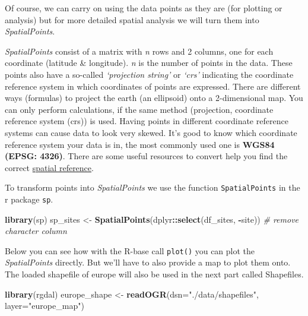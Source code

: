 \documentclass[
]{book}
\newenvironment{Shaded}{\begin{snugshade}}{\end{snugshade}}
\newcommand{\CommentTok}[1]{\textcolor[rgb]{0.56,0.35,0.01}{\textit{#1}}}
\newcommand{\DataTypeTok}[1]{\textcolor[rgb]{0.13,0.29,0.53}{#1}}
\newcommand{\KeywordTok}[1]{\textcolor[rgb]{0.13,0.29,0.53}{\textbf{#1}}}
\newcommand{\NormalTok}[1]{#1}
\newcommand{\OperatorTok}[1]{\textcolor[rgb]{0.81,0.36,0.00}{\textbf{#1}}}
\newcommand{\StringTok}[1]{\textcolor[rgb]{0.31,0.60,0.02}{#1}}
\begin{document}
Of course, we can carry on using the data points as they are (for plotting or analysis) but for more detailed spatial analysis we will turn them into \emph{SpatialPoints}.

\emph{SpatialPoints} consist of a matrix with \emph{n} rows and 2 columns, one for each coordinate (latitude \& longitude). \emph{n} is the number of points in the data. These points also have a so-called \emph{`projection string'} or \emph{`crs'} indicating the coordinate reference system in which coordinates of points are expressed.
There are different ways (formulas) to project the earth (an ellipsoid) onto a 2-dimensional map. You can only perform calculations, if the same method (projection, coordinate reference system (crs)) is used. Having points in different coordinate reference systems can cause data to look very skewed. It's good to know which coordinate reference system your data is in, the most commonly used one is \textbf{WGS84 (EPSG: 4326)}. There are some useful resources to convert help you find the correct \href{https://spatialreference.org/ref/epsg/4326/}{spatial reference}.

To transform points into \emph{SpatialPoints} we use the function \texttt{SpatialPoints} in the r package \texttt{sp}.

\begin{Shaded}
\begin{Highlighting}[]
\KeywordTok{library}\NormalTok{(sp)}
\NormalTok{sp_sites <-}\StringTok{ }\KeywordTok{SpatialPoints}\NormalTok{(dplyr}\OperatorTok{::}\KeywordTok{select}\NormalTok{(df_sites, }\OperatorTok{-}\NormalTok{site)) }\CommentTok{# remove character column}
\end{Highlighting}
\end{Shaded}

Below you can see how with the R-base call \texttt{plot()} you can plot the \emph{SpatialPoints} directly. But we'll have to also provide a map to plot them onto. The loaded shapefile of europe will also be used in the next part called Shapefiles.

\begin{Shaded}
\begin{Highlighting}[]
\KeywordTok{library}\NormalTok{(rgdal)}
\NormalTok{europe_shape <-}\StringTok{ }\KeywordTok{readOGR}\NormalTok{(}\DataTypeTok{dsn=}\StringTok{"./data/shapefiles"}\NormalTok{, }\DataTypeTok{layer=}\StringTok{"europe_map"}\NormalTok{)}
\end{Highlighting}
\end{Shaded}
\end{document}
